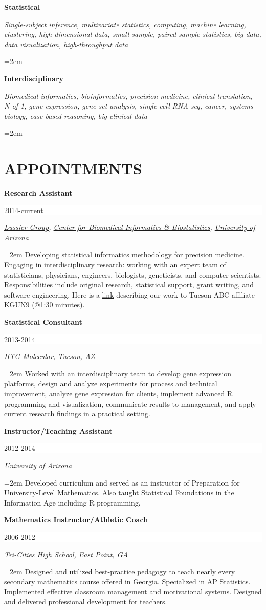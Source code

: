 \documentclass[paper=a4,fontsize=11pt]{scrartcl} %
\newcommand{\sepspace}{\vspace*{1em}}		%
\newcommand{\NewPart}[2]{\section*{\uppercase{#1} #2 }}
\newcommand{\EducationEntry}[4]{
		\noindent \textbf{#1} \hfill      %
		\colorbox{White}{%
			\parbox{6em}{%
			\hfill\color{Black}#2}} \par  %
		\noindent \textit{#3} \par        %
		\noindent\hangindent=2em\hangafter=0 \small #4 %
		\normalsize \par \vspace{-7pt}}
\begin{document}
\EducationEntry{Statistical}{}{Single-subject inference, multivariate statistics, computing, machine learning, clustering, high-dimensional data, small-sample, paired-sample statistics, big data, data visualization, high-throughput data}{}

\EducationEntry{Interdisciplinary}{}{Biomedical informatics, bioinformatics, precision medicine, clinical translation, N-of-1, gene expression, gene set analysis, single-cell RNA-seq, cancer, systems biology, case-based reasoning, big clinical data}{}

\NewPart{Appointments}{}
\vspace{-7pt}
\EducationEntry{Research Assistant}{2014-current}{{\href{http://lussierlab.org/}{Lussier Group}}, {\href{http://cb2.uahs.arizona.edu/}{Center for Biomedical Informatics \& Biostatistics}}, {\href{http://www.arizona.edu/}{University of Arizona}}}{Developing statistical informatics methodology for precision medicine. Engaging in interdisciplinary research: working with an expert team of statisticians, physicians, engineers, biologists, geneticists, and computer scientists. Responsibilities include original research, statistical support, grant writing, and software engineering. Here is a \href{http://cb2.uahs.arizona.edu/news/dr-lussier-and-grant-schissler-speak-big-data-kgun9-local-news}{link} describing our work to Tucson ABC-affiliate KGUN9 (@1:30 minutes).}
\sepspace

\EducationEntry{Statistical Consultant}{2013-2014}{HTG Molecular, Tucson, AZ}{Worked with an interdisciplinary team to develop gene expression platforms, design and analyze experiments for process and technical improvement, analyze gene expression for clients, implement advanced \textsc{R} programming and visualization, communicate results to management, and apply current research findings in a practical setting.}
\sepspace

\EducationEntry{Instructor/Teaching Assistant}{2012-2014}{University of Arizona}
{Developed curriculum and served as an instructor of Preparation for University-Level Mathematics. Also taught Statistical Foundations in the Information Age including \textsc{R} programming.}
\sepspace

\clearpage
\EducationEntry{Mathematics Instructor/Athletic Coach}{2006-2012}{Tri-Cities High School, East Point, GA}
{Designed and utilized best-practice pedagogy to teach nearly every secondary mathematics course offered in Georgia.  Specialized in AP Statistics. Implemented effective classroom management and motivational systems. Designed and delivered professional development for teachers.}
\end{document}
